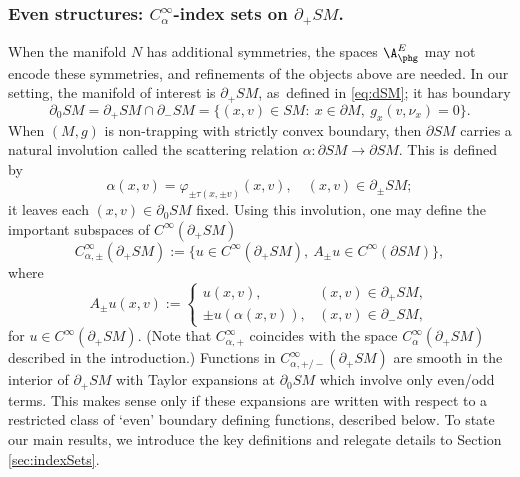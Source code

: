 \subsubsection*{Even structures: $C_\alpha^\infty$-index sets on $\partial_+ SM$.} When the manifold $N$ has additional symmetries, the spaces $\A_{\phg}^E$
may not encode these symmetries, and refinements of the objects above are needed. In our setting, the manifold of interest is $\partial_+ SM$,
as~defined in \eqref{eq:dSM}; it has boundary
\begin{equation*}
\partial_0 SM = \partial_+ SM\cap \partial_- SM = \{(x,v)\in SM:\ x\in \partial M,\ g_x(v,\nu_x) = 0\}.
\end{equation*}
When $(M,g)$ is non-trapping with strictly convex boundary, then $\partial SM$ carries a natural involution called the scattering relation
$\alpha\colon \partial SM\to \partial SM$. This is defined by
\begin{equation*}
\alpha(x,v) = \varphi_{\pm \tau(x,\pm v)} (x,v), \quad (x,v) \in \partial_\pm SM;
\end{equation*}
it leaves each $(x,v)\in \partial_0 SM$ fixed. Using this involution, one may define the important subspaces of $C^\infty(\partial_+ SM)$
\begin{equation}
C_{\alpha,\pm}^\infty (\partial_+ SM) := \{u\in C^\infty(\partial_+ SM),\ A_\pm u \in C^\infty(\partial SM)\},
\label{eq:Cpm}
\end{equation}
where
\begin{equation*}
A_\pm u(x,v) := 
\begin{cases}
u(x,v), & (x,v)\in \partial_+ SM, \\
\pm u(\alpha(x,v)), & (x,v)\in \partial_- SM,
\end{cases}
\end{equation*}
for $u\in C^\infty(\partial_+ SM)$.
(Note that $C_{\alpha,+}^\infty$ coincides with the space $C_\alpha^\infty(\partial_+ SM)$ described in the introduction.)
Functions in $C_{\alpha,+/-}^\infty (\partial_+ SM)$ are smooth in the interior of $\partial_+ SM$ with Taylor expansions at $\partial_0 SM$ which
involve only even/odd terms. This makes sense only if these expansions are written with respect to a restricted class of `even' boundary defining functions,
described below. To state our main results, we introduce the key definitions and relegate details to Section \ref{sec:indexSets}.

